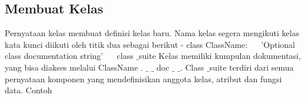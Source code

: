 \subsection {Membuat Kelas}
\vspace{12pt}
Pernyataan kelas membuat definisi kelas baru. Nama kelas segera mengikuti kelas kata kunci diikuti oleh titik dua sebagai berikut - 
\vspace{12pt}
\vspace{12pt}
\noindent 
class ClassName: 
\noindent 
~~ 'Optional class documentation string' 
\noindent
~~ class $  \_  $suite 
\vspace{12pt}
\vspace{12pt}
Kelas memiliki kumpulan dokumentasi, yang bisa diakses melalui ClassName . $  \_  $ $  \_  $ doc $  \_  $ $  \_  $.  Class $  \_  $suite terdiri dari semua pernyataan komponen yang mendefinisikan anggota kelas, atribut dan fungsi data. 
\vspace{12pt}
\vspace{12pt}
\noindent 
Contoh 
